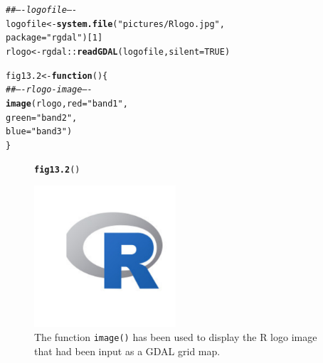 \documentclass[12pt, a4paper,  BCOR=8.25mm, DIV=15]{scrartcl}\usepackage[]{graphicx}\usepackage[]{color}
\makeatletter
\newcommand{\hlnum}[1]{\textcolor[rgb]{0.686,0.059,0.569}{#1}}%
\newcommand{\hlstr}[1]{\textcolor[rgb]{0.192,0.494,0.8}{#1}}%
\newcommand{\hlcom}[1]{\textcolor[rgb]{0.678,0.584,0.686}{\textit{#1}}}%
\newcommand{\hlopt}[1]{\textcolor[rgb]{0,0,0}{#1}}%
\newcommand{\hlstd}[1]{\textcolor[rgb]{0.345,0.345,0.345}{#1}}%
\newcommand{\hlkwa}[1]{\textcolor[rgb]{0.161,0.373,0.58}{\textbf{#1}}}%
\newcommand{\hlkwb}[1]{\textcolor[rgb]{0.69,0.353,0.396}{#1}}%
\newcommand{\hlkwc}[1]{\textcolor[rgb]{0.333,0.667,0.333}{#1}}%
\newcommand{\hlkwd}[1]{\textcolor[rgb]{0.737,0.353,0.396}{\textbf{#1}}}%
\newenvironment{kframe}{%
 \def\at@end@of@kframe{}%
 \ifinner\ifhmode%
  \def\at@end@of@kframe{\end{minipage}}%
  \begin{minipage}{\columnwidth}%
 \fi\fi%
 \def\FrameCommand##1{\hskip\@totalleftmargin \hskip-\fboxsep
 \colorbox{shadecolor}{##1}\hskip-\fboxsep
     \hskip-\linewidth \hskip-\@totalleftmargin \hskip\columnwidth}%
 \MakeFramed {\advance\hsize-\width
   \@totalleftmargin\z@ \linewidth\hsize
   \@setminipage}}%
 {\par\unskip\endMakeFramed%
 \at@end@of@kframe}
\newenvironment{knitrout}{}{} %
\newcommand{\txtt}[1]{{\texttt{#1}}}
\makeatother
\begin{document}
\begin{knitrout}
\color{fgcolor}\begin{kframe}
\begin{alltt}
\hlcom{## ---- logofile ----}
\hlstd{logofile} \hlkwb{<-} \hlkwd{system.file}\hlstd{(}\hlstr{"pictures/Rlogo.jpg"}\hlstd{,}
                        \hlkwc{package} \hlstd{=} \hlstr{"rgdal"}\hlstd{)[}\hlnum{1}\hlstd{]}
\hlstd{rlogo} \hlkwb{<-} \hlstd{rgdal}\hlopt{::}\hlkwd{readGDAL}\hlstd{(logofile,} \hlkwc{silent}\hlstd{=}\hlnum{TRUE}\hlstd{)}
\end{alltt}


{\ttfamily\noindent\color{warningcolor}{Warning in rgdal::readGDAL(logofile, silent = TRUE): GeoTransform values not available}}\begin{alltt}
\hlstd{fig13.2} \hlkwb{<-} \hlkwa{function}\hlstd{()\{}
\hlcom{## ---- rlogo-image ----}
\hlkwd{image}\hlstd{(rlogo,} \hlkwc{red}\hlstd{=}\hlstr{"band1"}\hlstd{,}
      \hlkwc{green}\hlstd{=}\hlstr{"band2"}\hlstd{,}
      \hlkwc{blue}\hlstd{=}\hlstr{"band3"}\hlstd{)}
\hlstd{\}}
\end{alltt}
\end{kframe}
\end{knitrout}

\begin{figure}
\begin{knitrout}
\color{fgcolor}\begin{kframe}
\begin{alltt}
\hlkwd{fig13.2}\hlstd{()}
\end{alltt}
\end{kframe}

{\centering \includegraphics[width=0.47\textwidth]{figs/map-rlogo-image-13_2-1} 

}



\end{knitrout}
\caption{The function \txtt{image()} has been used to display the R
  logo image that had been input as a GDAL grid map.\label{fig:rlogo}}
\end{figure}
\end{document}

